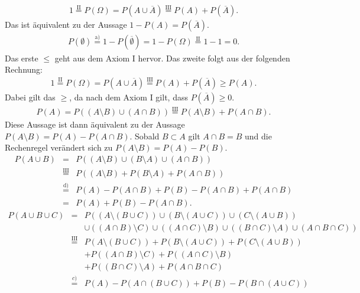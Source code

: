 \begin{Answer}
\Question 
\begin{eqnarray*}
	1\stackrel{\text{II}}{=}P(\Omega)=P(A\cup\overline{A})\stackrel{\text{III}}{=}P(A)+P(\overline{A}).
\end{eqnarray*}
Das ist äquivalent zu der Aussage $1-P(A)=P(\overline{A})$.
\Question 
\begin{eqnarray*}
	P(\emptyset)\stackrel{\text{a)}}{=}1-P(\overline{\emptyset})=1-P(\Omega)\stackrel{\text{II}}{=}1-1=0.
\end{eqnarray*}
\Question Das erste $\leq$ geht aus dem Axiom I hervor. Das zweite folgt aus der folgenden Rechnung:
\begin{eqnarray*}
1\stackrel{\text{II}}{=}P(\Omega)=P(A\cup\overline{A})\stackrel{\text{III}}{=}P(A)+P(\overline{A})\geq P(A).
\end{eqnarray*}
Dabei gilt das $\geq$, da nach dem Axiom I gilt, dass $P(\overline{A})\geq0$.
\Question 
\begin{eqnarray*}
	P(A)=P((A\setminus B)\cup (A\cap B))\stackrel{\text{III}}{=}P(A\setminus B)+P(A \cap B).
\end{eqnarray*}
Diese Aussage ist dann äquivalent zu der Aussage $P(A\setminus B)=P(A)-P(A\cap B)$.
Sobald $B\subset A$ gilt $A\cap B=B$ und die Rechenregel verändert sich zu $P(A\setminus B)=P(A)-P(B)$.
\Question 
\begin{eqnarray*}
	P(A\cup B)&=&P((A\setminus B)\cup(B\setminus A) \cup(A\cap B))\\
	&\stackrel{\text{III}}{=}&P((A\setminus B)+P(B\setminus A) +P(A\cap B))\\
	&\stackrel{\text{d)}}{=}&P(A)-P(A\cap B)+P(B)-P(A\cap B)+P(A\cap B)\\
	&=&P(A)+P(B)-P(A\cap B).
\end{eqnarray*}
\Question 
\begin{eqnarray*}
	P(A\cup B\cup C)&=&P\left((A\setminus (B\cup C))\cup (B\setminus (A\cup C))\cup (C\setminus(A\cup B))\right.\\
	&&\left.\cup ((A\cap B)\setminus C)\cup ((A\cap C)\setminus B)\cup ((B\cap C)\setminus A)\cup (A\cap B\cap C)\right)\\
	&\stackrel{\text{III}}{=}&P(A\setminus (B\cup C))+ P(B\setminus (A\cup C))+P(C\setminus(A\cup B))\\
	&&+ P((A\cap B)\setminus C)+ P((A\cap C)\setminus B)\\
	&&+ P((B\cap C)\setminus A)+ P(A\cap B\cap C)\\
	&\stackrel{c)}{=}&P(A)-P(A\cap(B\cup C))+P(B)-P(B\cap (A\cup C))\\

\end{eqnarray*}
\end{Answer}
